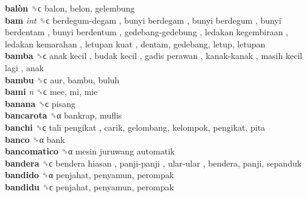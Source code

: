 \textbf{balòn} ␝ϲ  balon, belon, gelembung  \\
\textbf{bam} \emph{int}  ␝ϲ   berdegum-degam ,  bunyi berdegam ,  bunyi berdegum ,  bunyi berdentam ,  bunyi berdentum ,  gedebang-gedebung ,  ledakan kegembiraan ,  ledakan kemarahan ,  letupan kuat , dentam, gedebang, letup, letupan  \\
\textbf{bamba} ␝ϲ   anak kecil ,  budak kecil ,  gadis perawan ,  kanak-kanak ,  masih kecil lagi , anak  \\
\textbf{bambu} ␝ϲ  aur, bambu, buluh  \\
\textbf{bami} \emph{n}  ␝ϲ  mee, mi, mie  \\
\textbf{banana} ␝ϲ  pisang  \\
\textbf{bancarota} ␝α  bankrap, muflis  \\
\textbf{banchi} ␝ϲ   tali pengikat , carik, gelombang, kelompok, pengikat, pita  \\
\textbf{banco} ␝α  bank  \\
\textbf{bancomatico} ␝α   mesin juruwang automatik   \\
\textbf{bandera} ␝ϲ   bendera hiasan ,  panji-panji ,  ular-ular , bendera, panji, sepanduk  \\
\textbf{bandido} ␝α  penjahat, penyamun, perompak  \\
\textbf{bandidu} ␝ϲ  penjahat, penyamun, perompak  \\
